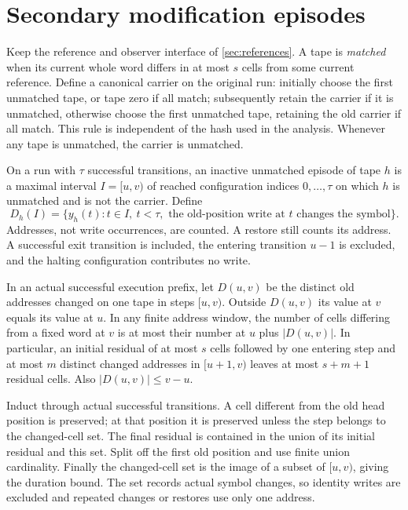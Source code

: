 \section{Secondary modification episodes}\label{sec:episodes}

Keep the reference and observer interface of \cref{sec:references}. A tape
is \emph{matched} when its current whole word differs in at most $s$ cells
from some current reference. Define a canonical carrier on the original run:
initially choose the first unmatched tape, or tape zero if all match;
subsequently retain the carrier if it is unmatched, otherwise choose the
first unmatched tape, retaining the old carrier if all match. This rule is
independent of the hash used in the analysis. Whenever any tape is unmatched,
the carrier is unmatched.

On a run with $\tau$ successful transitions, an inactive unmatched episode
of tape $h$ is a maximal interval $I=[u,v)$ of reached configuration indices
$0,\ldots,\tau$ on which $h$ is unmatched and is not the carrier. Define
\[
 D_h(I)=\{y_h(t):t\in I,\ t<\tau,\text{ the old-position write at }t
                   \text{ changes the symbol}\}.
\]
Addresses, not write occurrences, are counted. A restore still counts its
address. A successful exit transition is included, the entering transition
$u-1$ is excluded, and the halting configuration contributes no write.

\begin{lemma}\label{lem:changed-cell-support}
In an actual successful execution prefix, let $D(u,v)$ be the distinct
old addresses changed on one tape in steps $[u,v)$. Outside $D(u,v)$
its value at $v$ equals its value at $u$. In any finite address window,
the number of cells differing from a fixed word at $v$ is at most their
number at $u$ plus $|D(u,v)|$. In particular, an initial residual of at
most $s$ cells followed by one entering step and at most $m$ distinct
changed addresses in $[u+1,v)$ leaves at most $s+m+1$ residual cells.
Also $|D(u,v)|\le v-u$.
\end{lemma}
\begin{outline}
Induct through actual successful transitions. A cell different from the
old head position is preserved; at that position it is preserved unless
the step belongs to the changed-cell set. The final residual is contained
in the union of its initial residual and this set. Split off the first
old position and use finite union cardinality. Finally the changed-cell
set is the image of a subset of $[u,v)$, giving the duration bound.
The set records actual symbol changes, so identity writes are excluded
and repeated changes or restores use only one address.
\end{outline}


